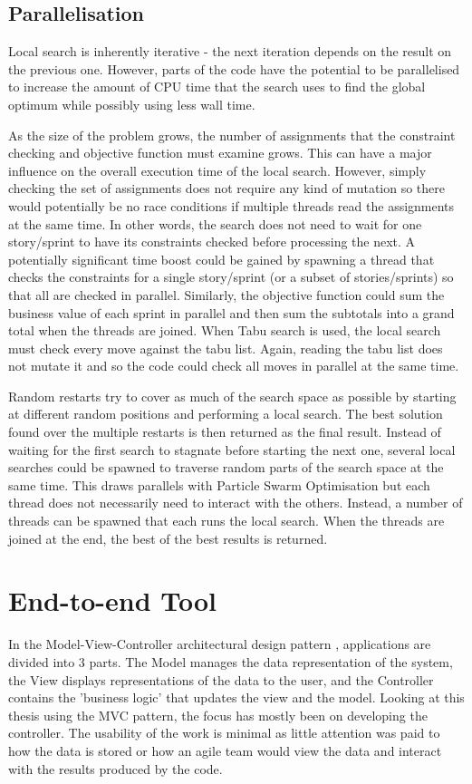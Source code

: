 \subsection{Parallelisation}
Local search is inherently iterative - the next iteration depends on the result on the previous one. However, parts of the code have the potential to be parallelised to increase the amount of CPU time that the search uses to find the global optimum while possibly using less wall time.

As the size of the problem grows, the number of assignments that the constraint checking and objective function must examine grows. This can have a major influence on the overall execution time of the local search. However, simply checking the set of assignments does not require any kind of mutation so there would potentially be no race conditions if multiple threads read the assignments at the same time. In other words, the search does not need to wait for one story/sprint to have its constraints checked before processing the next. A potentially significant time boost could be gained by spawning a thread that checks the constraints for a single story/sprint (or a subset of stories/sprints) so that all are checked in parallel. Similarly, the objective function could sum the business value of each sprint in parallel and then sum the subtotals into a grand total when the threads are joined. When Tabu search is used, the local search must check every move against the tabu list. Again, reading the tabu list does not mutate it and so the code could check all moves in parallel at the same time.

Random restarts try to cover as much of the search space as possible by starting at different random positions and performing a local search. The best solution found over the multiple restarts is then returned as the final result. Instead of waiting for the first search to stagnate before starting the next one, several local searches could be spawned to traverse random parts of the search space at the same time. This draws parallels with Particle Swarm Optimisation but each thread does not necessarily need to interact with the others. Instead, a number of threads can be spawned that each runs the local search. When the threads are joined at the end, the best of the best results is returned.

\section{End-to-end Tool}
In the Model-View-Controller architectural design pattern \citep{pope1988cookbook}, applications are divided into 3 parts. The Model manages the data representation of the system, the View displays representations of the data to the user, and the Controller contains the 'business logic' that updates the view and the model. Looking at this thesis using the MVC pattern, the focus has mostly been on developing the controller. The usability of the work is minimal as little attention was paid to how the data is stored or how an agile team would view the data and interact with the results produced by the code.

